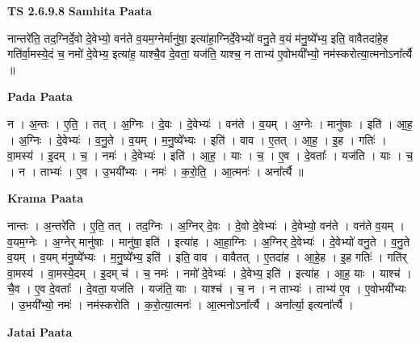 \documentclass[17pt]{extarticle}
\begin{document}
\textbf{TS 2.6.9.8 } \newline
\textbf{Samhita Paata} \newline

नान्तरे॑ति॒ तद॒ग्निर्दे॒वो दे॒वेभ्यो॒ वन॑ते व॒यम॒ग्नेर्मानु॑षा॒ इत्या॑हा॒ग्निर्दे॒वेभ्यो॑ वनु॒ते व॒यं म॑नु॒ष्ये᳚भ्य॒ इति॒ वावैतदा॑हे॒ह गति॑र्वा॒मस्ये॒दं च॒ नमो॑ दे॒वेभ्य॒ इत्या॑ह॒ याश्चै॒व दे॒वता॒ यज॑ति॒ याश्च॒ न ताभ्य॑ ए॒वोभयी᳚भ्यो॒ नम॑स्करोत्या॒त्मनोऽना᳚र्त्यै ॥ \newline

\textbf{Pada Paata} \newline

न । अ॒न्तः । ए॒ति॒ । तत् । अ॒ग्निः । दे॒वः । दे॒वेभ्यः॑ । वन॑ते । व॒यम् । अ॒ग्नेः । मानु॑षाः । इति॑ । आ॒ह॒ । अ॒ग्निः । दे॒वेभ्यः॑ । व॒नु॒ते । व॒यम् । म॒नु॒ष्ये᳚भ्यः । इति॑ । वाव । ए॒तत् । आ॒ह॒ । इ॒ह । गतिः॑ । वा॒मस्य॑ । इ॒दम् । च॒ । नमः॑ । दे॒वेभ्यः॑ । इति॑ । आ॒ह॒ । याः । च॒ । ए॒व । दे॒वताः᳚ । यज॑ति । याः । च॒ । न । ताभ्यः॑ । ए॒व । उ॒भयी᳚भ्यः । नमः॑ । क॒रो॒ति॒ । आ॒त्मनः॑ । अना᳚र्त्यै ॥  \newline


\textbf{Krama Paata} \newline

नान्तः । अ॒न्तरे॑ति । ए॒ति॒ तत् । तद॒ग्निः । अ॒ग्निर् दे॒वः । दे॒वो दे॒वेभ्यः॑ । दे॒वेभ्यो॒ वन॑ते । वन॑ते व॒यम् । व॒यम॒ग्नेः । अ॒ग्नेर् मानु॑षाः । मानु॑षा॒ इति॑ । इत्या॑ह । आ॒हा॒ग्निः । अ॒ग्निर् दे॒वेभ्यः॑ । दे॒वेभ्यो॑ वनु॒ते । व॒नु॒ते व॒यम् । व॒यम् म॑नु॒ष्ये᳚भ्यः । म॒नु॒ष्ये᳚भ्य॒ इति॑ । इति॒ वाव । वावैतत् । ए॒तदा॑ह । आ॒हे॒ह । इ॒ह गतिः॑ । गति॑र् वा॒मस्य॑ । वा॒मस्ये॒दम् । इ॒दम् च॑ । च॒ नमः॑ । नमो॑ दे॒वेभ्यः॑ । दे॒वेभ्य॒ इति॑ । इत्या॑ह । आ॒ह॒ याः । याश्च॑ । चै॒व । ए॒व दे॒वताः᳚ । दे॒वता॒ यज॑ति । यज॑ति॒ याः । याश्च॑ । च॒ न । न ताभ्यः॑ । ताभ्य॑ ए॒व । ए॒वोभयी᳚भ्यः । उ॒भयी᳚भ्यो॒ नमः॑ । नम॑स्करोति । क॒रो॒त्या॒त्मनः॑ । आ॒त्मनोऽना᳚र्त्यै । अना᳚र्त्या॒ इत्यना᳚र्त्यै । \newline

\textbf{Jatai Paata} \newline
\end{document}
